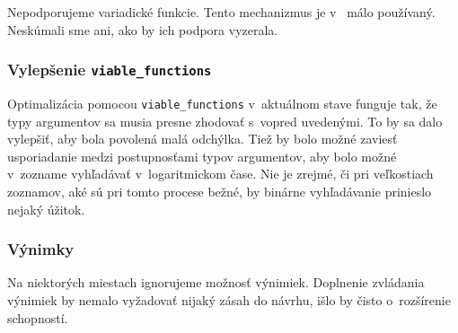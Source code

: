 Nepodporujeme variadické funkcie. Tento mechanizmus je v~\Cpp{} málo používaný. Neskúmali sme ani, ako by ich podpora vyzerala.

\subsubsection{Vylepšenie \texttt{viable\_functions}}

Optimalizácia pomocou \texttt{viable\_functions} v~aktuálnom stave funguje tak, že typy argumentov sa musia presne zhodovať s~vopred uvedenými. To by sa dalo vylepšiť, aby bola povolená malá odchýlka. Tiež by bolo možné zaviesť usporiadanie medzi postupnosťami typov argumentov, aby bolo možné v~zozname vyhľadávať v~logaritmickom čase. Nie je zrejmé, či pri veľkostiach zoznamov, aké sú pri tomto procese bežné, by binárne vyhľadávanie prinieslo nejaký úžitok.

\subsubsection{Výnimky}

Na niektorých miestach ignorujeme možnosť výnimiek. Doplnenie zvládania výnimiek by nemalo vyžadovať nijaký zásah do návrhu, išlo by čisto o~rozšírenie schopností.
